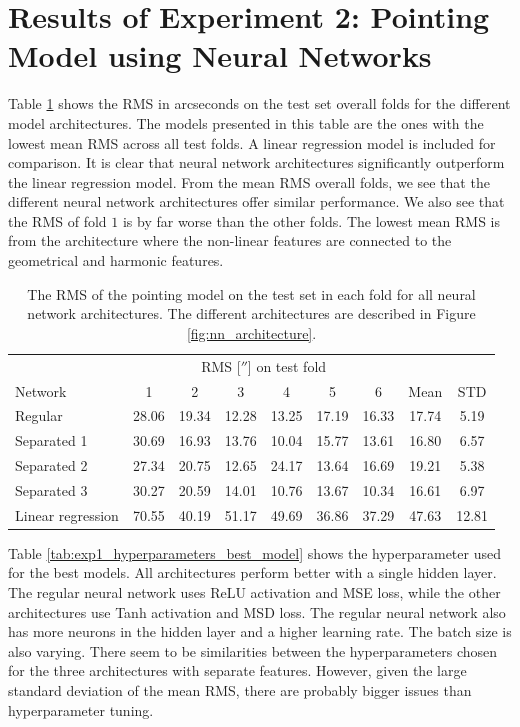 \section{Results of Experiment 2: Pointing Model using Neural Networks}

Table \ref{tab:exp1_rms_folds_best_model} shows the RMS in arcseconds on the test set overall folds for the different model architectures.
The models presented in this table are the ones with the lowest mean RMS across all test folds.
A linear regression model is included for comparison. 
It is clear that neural network architectures significantly outperform the linear regression model.
From the mean RMS overall folds, we see that the different neural network architectures offer similar performance.
We also see that the RMS of fold $1$ is by far worse than the other folds.
The lowest mean RMS is from the architecture where the non-linear features are connected to the geometrical and harmonic features.\\

\begin{table}[!htbp]
    \centering
    \caption{The RMS of the pointing model on the test set in each fold for all neural network architectures.
    The different architectures are described in Figure \ref{fig:nn_architecture}.}
    \begin{tabular}{lcccccccc}
        \toprule
        & \multicolumn{6}{c}{RMS [$''$] on test fold} & & \\
        \cmidrule(lr){2-7}
        Network & 1 & 2 & 3 & 4 & 5 & 6 & Mean & STD\\
        \midrule
        Regular           & 28.06 & 19.34 & 12.28 & 13.25 & 17.19 & 16.33 & 17.74 & 5.19 \\
        Separated 1       & 30.69 & 16.93 & 13.76 & 10.04 & 15.77 & 13.61 & 16.80 & 6.57 \\
        Separated 2       & 27.34 & 20.75 & 12.65 & 24.17 & 13.64 & 16.69 & 19.21 & 5.38 \\
        Separated 3       & 30.27 & 20.59 & 14.01 & 10.76 & 13.67 & 10.34 & 16.61 & 6.97 \\
        Linear regression & 70.55 & 40.19 & 51.17 & 49.69 & 36.86 & 37.29 & 47.63 & 12.81 \\
        \bottomrule
    \end{tabular}
    \label{tab:exp1_rms_folds_best_model}
\end{table}


Table \ref{tab:exp1_hyperparameters_best_model} shows the hyperparameter used for the best models.
All architectures perform better with a single hidden layer.
The regular neural network uses ReLU activation and MSE loss, while the other architectures use Tanh activation and MSD loss.
The regular neural network also has more neurons in the hidden layer and a higher learning rate.
The batch size is also varying. There seem to be similarities between the hyperparameters chosen for the three architectures with separate features.
However, given the large standard deviation of the mean RMS, there are probably bigger issues than hyperparameter tuning.\\

